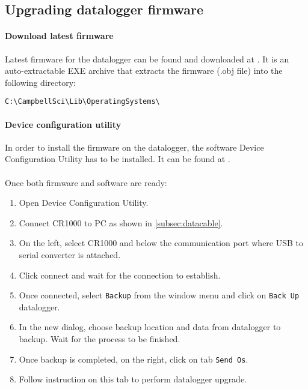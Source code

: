 \subsection{Upgrading datalogger firmware}
\paragraph{Download latest firmware} Latest firmware for the datalogger can be found and downloaded at \cite{cs4}. It is an auto-extractable EXE archive that extracts the firmware (.obj file) into the following directory:
\begin{center}
	{\tt C:\textbackslash CampbellSci\textbackslash Lib\textbackslash OperatingSystems\textbackslash }
\end{center}
\paragraph{Device configuration utility} In order to install the firmware on the datalogger, the software Device Configuration Utility has to be installed. It can be found at \cite{cs3}.
\paragraph{} Once both firmware and software are ready:
\begin{enumerate}
	\item Open Device Configuration Utility.
	\item Connect CR1000 to PC as shown in \ref{subsec:datacable}.
	\item On the left, select CR1000 and below the communication port where USB to serial converter is attached.
	\item Click connect and wait for the connection to establish.
	\item Once connected, select {\tt Backup} from the window menu and click on {\tt Back Up} datalogger.
	\item In the new dialog, choose backup location and data from datalogger to backup. Wait for the process to be finished.
	\item Once backup is completed, on the right, click on tab {\tt Send Os}.
	\item Follow instruction on this tab to perform datalogger upgrade.
\end{enumerate}